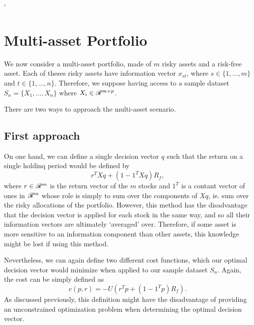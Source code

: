 `\section{Multi-asset Portfolio}

We now consider a multi-asset portfolio, made of $m$ risky assets and a risk-free
asset. Each of theses risky assets have information vector $x_{st}$, where
$s\in\{1,\ldots,m\}$ and $t\in\{1,\ldots,n\}$. Therefore, we suppose having access to a
sample dataset $S_n = \{X_1,\ldots,X_n\}$ where $X_i\in\mathscr{R}^{m\times p}$.

There are two ways to approach the multi-asset scenario. 


\subsection{First approach}

On one hand, we can define a single decision vector $q$ such that the return on a single
holdinq period would be defined by
\begin{equation}
  r^{T}Xq + (1 - 1^{T}Xq)R_f,
\end{equation}
where $r\in\mathscr{R}^{m}$ is the return vector of the $m$ stocks and $1^T$ is a contant vector
of ones in $\mathscr{R}^m$ whose role is simply to sum over the components of $Xq$, ie. sum over
the risky allocations of the portfolio. However, this method has the disadvantage that the
decision vector is applied for each stock in the same way, and so all their information
vectors are ultimately `averaged' over. Therefore, if some asset is more sensitive to an
information component than other assets, this knowledge might be lost if using this
method. 

Nevertheless, we can again define two different cost functions, which our optimal decision
vector would minimize when applied to our sample dataset $S_n$. Again, the cost can be
simply defined as
\begin{equation}
  \label{multiCost}
  c(p,r) = -U(r^{T}p + (1 - 1^{T}p)R_f).
\end{equation}
As discussed previously, this definition might have the disadvantage of providing an
unconstrained optimization problem when determining the optimal decision vector.

